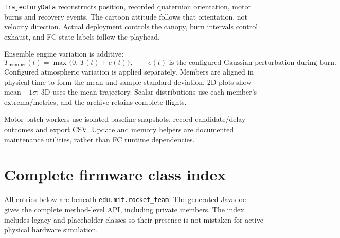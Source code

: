 \documentclass[10pt,letterpaper]{article}
\newcommand{\code}[1]{\nolinkurl{#1}}
\newcommand{\class}[1]{\nolinkurl{#1}}
\begin{document}
\class{TrajectoryData} reconstructs position, recorded quaternion orientation,
motor burns and recovery events. The cartoon attitude follows that orientation,
not velocity direction. Actual deployment controls the canopy, burn intervals
control exhaust, and FC state labels follow the playhead.

Ensemble engine variation is additive:
\begin{equation}
 T_{\mathrm{member}}(t)=\max\{0,\,T(t)+e(t)\},
 \qquad e(t)\text{ is the configured Gaussian perturbation during burn}.
\end{equation}
Configured atmospheric variation is applied separately. Members are aligned
in physical time to form the mean and sample standard deviation. 2D plots
show mean \(\pm1\sigma\); 3D uses the mean trajectory. Scalar distributions
use each member's extrema/metrics, and the archive retains complete flights.

Motor-batch workers use isolated baseline snapshots, record candidate/delay
outcomes and export CSV. Update and memory helpers are documented maintenance
utilities, rather than FC runtime dependencies.

\clearpage
\section{Complete firmware class index}
All entries below are beneath \code{edu.mit.rocket_team}. The generated
Javadoc gives the complete method-level API, including private members.
The index includes legacy and placeholder classes so their presence is not
mistaken for active physical hardware simulation.
\end{document}
